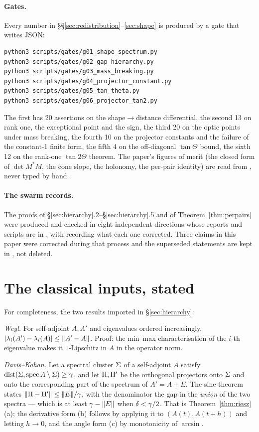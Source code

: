 \paragraph{Gates.} Every number in \S\S\ref{sec:redistribution}--\ref{sec:shape} is produced by a
gate that writes JSON:
\begin{verbatim}
python3 scripts/gates/g01_shape_spectrum.py
python3 scripts/gates/g02_gap_hierarchy.py
python3 scripts/gates/g03_mass_breaking.py
python3 scripts/gates/g04_projector_constant.py
python3 scripts/gates/g05_tan_theta.py
python3 scripts/gates/g06_projector_tan2.py
\end{verbatim}
The first has 20 assertions on the shape$\to$distance differential, the second 13 on rank one,
the exceptional point and the sign, the third 20 on the optic points under mass breaking, the fourth 10 on the projector constants and the failure of the constant-1 finite form, the fifth 4 on the off-diagonal $\tan\Theta$ bound, the sixth 12 on the rank-one $\tan 2\Theta$ theorem.
The paper's figures of merit (the closed form of $\det M^*M$, the cone slope, the holonomy, the
per-pair identity) are read from , never typed by hand.

\paragraph{The swarm records.} The proofs of \S\ref{sec:hierarchy}.2--\S\ref{sec:hierarchy}.5 and of
Theorem~\ref{thm:perpairs} were produced and checked in eight independent directions whose
reports and scripts are in , with  recording what each one
corrected. Three claims in this paper were corrected during that process and the superseded
statements are kept in , not deleted.

\section{The classical inputs, stated}\label{app:classical}

For completeness, the two results imported in \S\ref{sec:hierarchy}:

\emph{Weyl.} For self-adjoint $A,A'$ and eigenvalues ordered increasingly,
$\lvert\lambda_i(A')-\lambda_i(A)\rvert\le\lVert A'-A\rVert$. Proof: the min--max characterisation of the
$i$-th eigenvalue makes it $1$-Lipschitz in $A$ in the operator norm.

\emph{Davis--Kahan.} Let a spectral cluster $\Sigma$ of a self-adjoint $A$ satisfy
$\operatorname{dist}(\Sigma,\operatorname{spec}A\setminus\Sigma)\ge\gamma$, and let $\Pi,\Pi'$ be
the orthogonal projectors onto $\Sigma$ and onto the corresponding part of the spectrum of
$A'=A+E$. The sine theorem states $\lVert\Pi-\Pi'\rVert\le\lVert E\rVert/\gamma$, with the denominator the gap
in the \emph{union} of the two spectra --- which is at least $\gamma-\lVert E\rVert$ when $\delta<\gamma/2$.
That is Theorem~\ref{thm:riesz}(a); the derivative form (b) follows by applying it to
$(A(t),A(t+h))$ and letting $h\to0$, and the angle form (c) by monotonicity of $\arcsin$.

